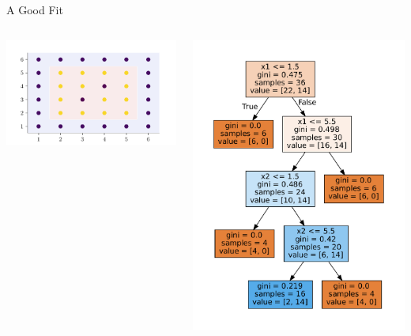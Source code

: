 \documentclass[usenames,dvipsnames]{beamer}
\begin{document}
\begin{frame}{A Good Fit}
\begin{columns}
\begin{column}{0.5\textwidth}
\includegraphics[width=\textwidth]{../assets/bias-variance/figures/bias-variance-good-fit.pdf}
\end{column}
\begin{column}{0.5\textwidth}
\includegraphics[width =\textwidth]{../assets/bias-variance/figures/bias-variance-good-fit-sklearn.pdf}
\end{column}
\end{columns}

\end{frame}
\end{document}
